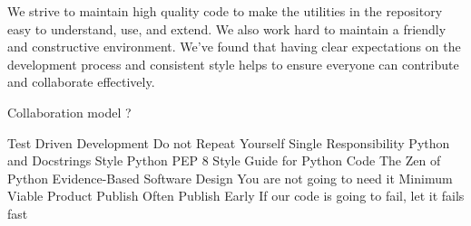 We strive to maintain high quality code to make the utilities in the repository easy to understand, use, and extend. We also work hard to maintain a friendly and constructive environment. We've found that having clear expectations on the development process and consistent style helps to ensure everyone can contribute and collaborate effectively.

Collaboration model ?

Test Driven Development
Do not Repeat Yourself
Single Responsibility
Python and Docstrings Style
Python PEP 8 Style Guide for Python Code
The Zen of Python
Evidence-Based Software Design
You are not going to need it
Minimum Viable Product
Publish Often Publish Early
If our code is going to fail, let it fails fast

